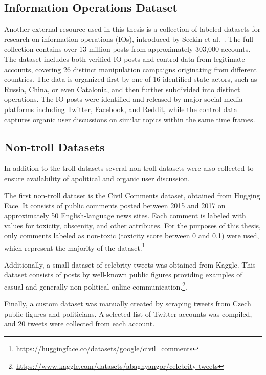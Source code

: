 \documentclass[twoside]{ctuthesis}
\theoremstyle{plain}
\theoremstyle{definition}
\theoremstyle{note}
\begin{document}
\subsection{Information Operations Dataset}
Another external resource used in this thesis is a collection of labeled datasets for research on information operations (IOs), introduced by Seckin et al.~\cite{Seckin2024}. The full collection contains over 13 million posts from approximately 303,000 accounts. The dataset includes both verified IO posts and control data from legitimate accounts, covering 26 distinct manipulation campaigns originating from different countries. The data is organized first by one of 16 identified state actors, such as Russia, China, or even Catalonia, and then further subdivided into distinct operations. The IO posts were identified and released by major social media platforms including Twitter, Facebook, and Reddit, while the control data captures organic user discussions on similar topics within the same time frames.

\subsection{Non-troll Datasets}
In addition to the troll datasets several non-troll datasets were also collected to ensure availability of apolitical and organic user discussion.\par
The first non-troll dataset is the Civil Comments dataset, obtained from Hugging Face. It consists of public comments posted between 2015 and 2017 on approximately 50 English-language news sites. Each comment is labeled with values for toxicity, obscenity, and other attributes. For the purposes of this thesis, only comments labeled as non-toxic (toxicity score between 0 and 0.1) were used, which represent the majority of the dataset.\footnote{\url{https://huggingface.co/datasets/google/civil_comments}}\par

Additionally, a small dataset of celebrity tweets was obtained from Kaggle. This dataset consists of posts by well-known public figures providing examples of casual and generally non-political online communication.\footnote{\url{https://www.kaggle.com/datasets/abaghyangor/celebrity-tweets}}.\par

Finally, a custom dataset was manually created by scraping tweets from Czech public figures and politicians. A selected list of Twitter accounts was compiled, and 20 tweets were collected from each account. \par
\end{document}
